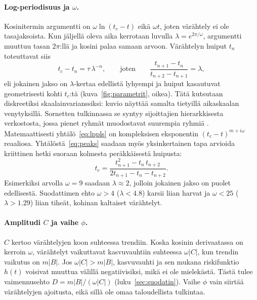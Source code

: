 \documentclass[10pt,a4paper]{article}
\newcommand{\tc}{t_c}
\begin{document}
\paragraph{Log-periodisuus ja $\omega$.} Kosinitermin argumentti on $\omega\ln(\tc-t)$
eikä $\omega t$, joten värähtely ei ole tasajaksoista. Kun jäljellä oleva aika kerrotaan
luvulla $\lambda=e^{2\pi/\omega}$, argumentti muuttuu tasan $2\pi$:llä ja kosini palaa samaan
arvoon. Värähtelyn huiput $t_n$ toteuttavat siis
\begin{equation}\label{eq:peaks}
  \tc - t_n = \tau\,\lambda^{-n}, \qquad\text{joten}\qquad
  \frac{t_{n+1}-t_n}{t_{n+2}-t_{n+1}} = \lambda ,
\end{equation}
eli jokainen jakso on $\lambda$-kertaa edellistä lyhyempi ja huiput kasautuvat
geometrisesti kohti $\tc$:tä (kuva~\ref{fig:parametrit}, oikea). Tätä kutsutaan
diskreetiksi skaalainvarianssiksi: kuvio näyttää samalta tietyillä aikaskaalan
venytyksillä. Sornetten tulkinnassa se syntyy sijoittajien hierarkkisesta verkostosta, jossa
pienet ryhmät muodostavat suurempia ryhmiä \citep{sornette2003}. Matemaattisesti
yhtälö~\eqref{eq:lppls} on kompleksisen eksponentin $(\tc-t)^{m+i\omega}$ reaaliosa.
Yhtälöstä~\eqref{eq:peaks} saadaan myös yksinkertainen tapa arvioida kriittinen hetki suoraan
kolmesta peräkkäisestä huipusta:
\begin{equation}\label{eq:tc3}
  \tc = \frac{t_{n+1}^2 - t_n\,t_{n+2}}{2t_{n+1} - t_n - t_{n+2}} .
\end{equation}
Esimerkiksi arvolla $\omega=9$ saadaan $\lambda\approx 2$, jolloin jokainen jakso on puolet
edellisestä. Suodattimen ehto $\omega>4$ ($\lambda<4.8$) karsii liian harvat ja $\omega<25$
($\lambda>1.29$) liian tiheät, kohinan kaltaiset värähtelyt.

\paragraph{Amplitudi $C$ ja vaihe $\phi$.} $C$ kertoo värähtelyjen koon suhteessa trendiin.
Koska kosinin derivaatassa on kerroin $\omega$, värähtelyt vaikuttavat kasvuvauhtiin
suhteessa $\omega|C|$, kun trendin vaikutus on $m|B|$. Jos $\omega|C|>m|B|$, kasvuvauhti ja
sen mukana riskifunktio $h(t)$ voisivat muuttua välillä negatiivisiksi, mikä ei ole mielekästä.
Tästä tulee vaimennusehto $D=m|B|/(\omega|C|)$ (luku~\ref{sec:suodatin}). Vaihe $\phi$ vain
siirtää värähtelyjen ajoitusta, eikä sillä ole omaa taloudellista tulkintaa.
\end{document}
